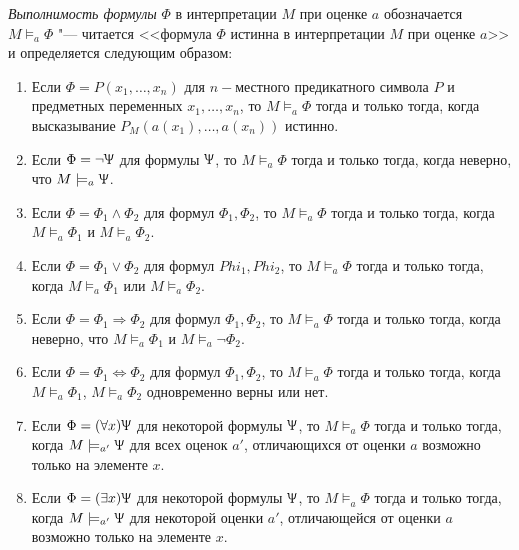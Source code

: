 \begin{definition}
    \textit{Выполнимость формулы} $\Phi$ в интерпретации $M$ при оценке $a$ обозначается $M\models_a \Phi$ "--- читается <<формула $\Phi$ истинна в интерпретации $M$ при оценке $a$>> и определяется следующим образом:
    \begin{enumerate}
        \item Если $\Phi=P(x_1,\ldots,x_n)$ для $n-$местного предикатного символа $P$ и предметных переменных $x_1,\ldots,x_n$, то $M\models_a\Phi$ тогда и только тогда, когда высказывание $P_M(a(x_1),\ldots,a(x_n))$ истинно.
        
        \item Если $\Phi=\lnot \Uppsi$ для формулы $\Uppsi$, то $M\models_a\Phi$ тогда и только тогда, когда неверно, что $M\models_a\Uppsi$.

        \item Если $\Phi=\Phi_1\land\Phi_2$ для формул $\Phi_1,\Phi_2$, то $M\models_a\Phi$ тогда и только тогда, когда $M\models_a\Phi_1$ и $M\models_a\Phi_2$.

        \item Если $\Phi = \Phi_1\lor\Phi_2$ для формул $Phi_1,Phi_2$, то $M\models_a\Phi$ тогда и только тогда, когда $M\models_a\Phi_1$ или $M\models_a\Phi_2$.

        \item  Если $\Phi = \Phi_1\Rightarrow\Phi_2$ для формул $\Phi_1,\Phi_2$, то $M\models_a\Phi$ тогда и только тогда, когда неверно, что $M\models_a\Phi_1$ и $M\models_a\lnot\Phi_2$.
        
        \item Если $\Phi=\Phi_1\Leftrightarrow\Phi_2$ для формул $\Phi_1,\Phi_2$, то $M\models_a\Phi$ тогда и только тогда, когда $M\models_a\Phi_1$, $M\models_a\Phi_2$ одновременно верны или нет.

        \item Если $\Phi=(\forall x)\Uppsi$ для некоторой формулы $\Uppsi$, то $M\models_a\Phi$ тогда и только тогда, когда $M\models_{a'}\Uppsi$ для всех оценок $a'$, отличающихся от оценки $a$ возможно только на элементе $x$.

        \item Если $\Phi=(\exists x)\Uppsi$ для некоторой формулы $\Uppsi$, то $M\models_a\Phi$ тогда и только тогда, когда $M\models_{a'}\Uppsi$ для некоторой оценки $a'$, отличающейся от оценки $a$ возможно только на элементе $x$.
    \end{enumerate}
\end{definition}

